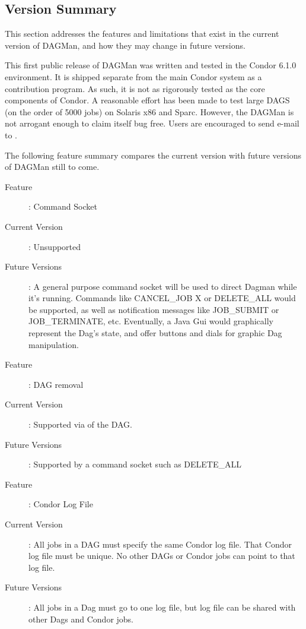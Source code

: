 \subsection{\label{dagman:version}Version Summary}

This section addresses the features and limitations that exist in the current
version of DAGMan, and how they may change in future versions.

This first public release of DAGMan was written and tested in the Condor 6.1.0
environment.  It is shipped separate from the main Condor system as a
contribution program.  As such, it is not as rigorously tested as the core
components of Condor.  A reasonable effort has been made to test large DAGS
(on the order of 5000 jobs) on Solaris x86 and Sparc.  However, the DAGMan is
not arrogant enough to claim itself bug free.  Users are encouraged to send
e-mail to .

The following feature summary compares the current version with future
versions of DAGMan still to come.

\begin{description}
\item[Feature] : Command Socket
\item[Current Version] : Unsupported
\item[Future Versions] : A general purpose command socket will be used to
direct Dagman while it's running.  Commands like CANCEL\_JOB X or DELETE\_ALL
would be supported, as well as notification messages like JOB\_SUBMIT or
JOB\_TERMINATE, etc.  Eventually, a Java Gui would graphically represent the
Dag's state, and offer buttons and dials for graphic Dag manipulation.
\end{description}

\begin{description}
\item[Feature]: DAG removal
\item[Current Version]: Supported via  of the DAG.
\item[Future Versions]: Supported by a command socket such as DELETE\_ALL
\end{description}

\begin{description}
\item[Feature]: Condor Log File
\item[Current Version]: All jobs in a DAG must specify the same Condor log
file.  That Condor log file must be unique.  No other DAGs or Condor jobs can
point to that log file.
\item[Future Versions]: All jobs in a Dag must go to one log file, but
log file can be shared with other Dags and Condor jobs.
\end{description}

